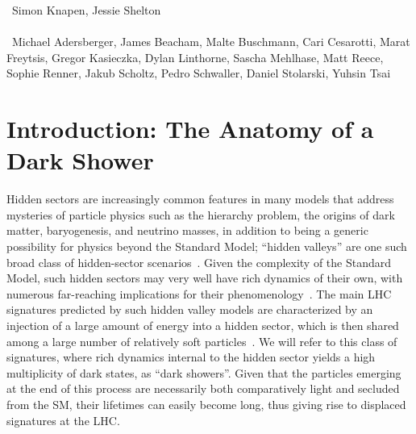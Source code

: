 ~Simon Knapen, Jessie Shelton \\
\text{ \; }\\
~Michael Adersberger, James Beacham, Malte Buschmann, Cari Cesarotti, Marat Freytsis, Gregor Kasieczka, Dylan Linthorne,  Sascha Mehlhase,  Matt Reece, Sophie Renner, Jakub Scholtz, Pedro Schwaller, Daniel Stolarski, Yuhsin Tsai 
\text{ \; }\\

\section{Introduction: The Anatomy of a Dark Shower}
\label{sec:darkshowerintro}

Hidden sectors are increasingly common features in many models that address mysteries of particle physics such as the hierarchy problem, the origins of dark matter, baryogenesis, and neutrino masses, in addition to being a generic possibility for physics beyond the Standard Model; ``hidden valleys'' are one such broad class of hidden-sector scenarios~\cite{Strassler:2006im,Han:2007ae}. Given the complexity of the Standard Model, such hidden sectors may very well have rich dynamics of their own, with numerous far-reaching implications for their phenomenology~\cite{Strassler:2006ri,Strassler:2006qa,Strassler:2008bv,Strassler:2008fv,Juknevich:2009ji}. The main LHC signatures predicted by such hidden valley models are characterized by an injection of a large amount of energy into a hidden sector, which is then shared among a large number of relatively soft particles~\cite{Strassler:2008bv}. We will refer to this class of signatures, where rich dynamics internal to the hidden sector yields a high multiplicity of dark states, as ``dark showers''. Given that the particles emerging at the end of this process are necessarily both comparatively light and secluded from the SM, their lifetimes can easily become long, thus giving rise to displaced signatures at the LHC.


